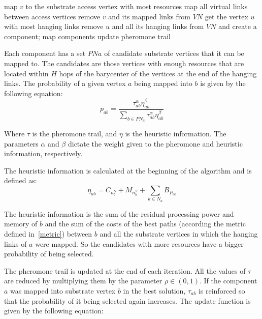 \documentclass[10pt, a4paper, twocolumn]{article}
\begin{document}
\begin{algorithm}
  {map $v$ to the substrate access vertex with most resources\;
   map all virtual links between access vertices\;
   remove $v$ and its mapped links from $VN$}
  {get the vertex $u$ with most hanging links\;
   remove $u$ and all its hanging links from $VN$ and create a component;
  }
  {
    {map components\;}
    update pheromone trail\;
  }
\caption{ACO for the network embedding problem}
\label{algo}
\end{algorithm}

Each component has a set $PNa$ of candidate substrate vertices that it can be mapped to. The candidates are those vertices with enough resources that are located within $H$ hops of the barycenter of the vertices at the end of the hanging links. The probability of a given vertex $a$ being mapped into $b$ is given by the following equation:
\begin{equation}
  p_{ab} = \frac{\tau^{\alpha}_{ab} \eta^{\beta}_{ab}}
  {\sum_{b \in PN_{a}} \tau^{\alpha}_{ab} \eta^{\beta}_{ab}}
\end{equation}

Where $\tau$ is the pheromone trail, and $\eta$ is the heuristic information. The parameters $\alpha$ and $\beta$ dictate the weight given to the pheromone and heuristic information, respectively. 

The heuristic information is calculated at the beginning of the algorithm and is defined as:
\begin{equation}
  \eta_{ab} = C_{n^{S}_{b}} + M_{n^{S}_{b}} + \sum_{k \in N_{a}} B_{P_{bk}}
\end{equation}

The heuristic information is the sum of the residual processing power and memory of $b$ and the sum of the costs of the best paths (according the metric defined in~\ref{metric}) between $b$ and all the substrate vertices in which the hanging links of $a$ were mapped. So the candidates with more resources have a bigger probability of being selected.

The pheromone trail is updated at the end of each iteration. All the values of $\tau$ are reduced by multiplying them by the parameter $\rho \in (0,1)$. If the component $a$ was mapped into substrate vertex $b$ in the best solution, $\tau_{ab}$ is reinforced so that the probability of it being selected again increases. The update function is given by the following equation:
\end{document}
